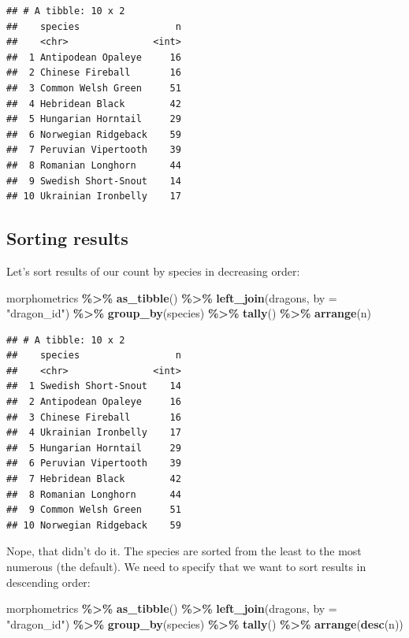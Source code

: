 \documentclass[
]{book}
\newenvironment{Shaded}{\begin{snugshade}}{\end{snugshade}}
\newcommand{\AttributeTok}[1]{\textcolor[rgb]{0.13,0.29,0.53}{#1}}
\newcommand{\FunctionTok}[1]{\textcolor[rgb]{0.13,0.29,0.53}{\textbf{#1}}}
\newcommand{\NormalTok}[1]{#1}
\newcommand{\SpecialCharTok}[1]{\textcolor[rgb]{0.81,0.36,0.00}{\textbf{#1}}}
\newcommand{\StringTok}[1]{\textcolor[rgb]{0.31,0.60,0.02}{#1}}
\begin{document}
\begin{verbatim}
## # A tibble: 10 x 2
##    species                 n
##    <chr>               <int>
##  1 Antipodean Opaleye     16
##  2 Chinese Fireball       16
##  3 Common Welsh Green     51
##  4 Hebridean Black        42
##  5 Hungarian Horntail     29
##  6 Norwegian Ridgeback    59
##  7 Peruvian Vipertooth    39
##  8 Romanian Longhorn      44
##  9 Swedish Short-Snout    14
## 10 Ukrainian Ironbelly    17
\end{verbatim}

\hypertarget{sorting-results-1}{%
\subsection{Sorting results}\label{sorting-results-1}}

Let's sort results of our count by species in decreasing order:

\begin{Shaded}
\begin{Highlighting}[]
\NormalTok{morphometrics }\SpecialCharTok{\%\textgreater{}\%} 
  \FunctionTok{as\_tibble}\NormalTok{() }\SpecialCharTok{\%\textgreater{}\%} 
  \FunctionTok{left\_join}\NormalTok{(dragons, }\AttributeTok{by =} \StringTok{"dragon\_id"}\NormalTok{) }\SpecialCharTok{\%\textgreater{}\%}  
  \FunctionTok{group\_by}\NormalTok{(species) }\SpecialCharTok{\%\textgreater{}\%}
  \FunctionTok{tally}\NormalTok{() }\SpecialCharTok{\%\textgreater{}\%} 
  \FunctionTok{arrange}\NormalTok{(n)}
\end{Highlighting}
\end{Shaded}

\begin{verbatim}
## # A tibble: 10 x 2
##    species                 n
##    <chr>               <int>
##  1 Swedish Short-Snout    14
##  2 Antipodean Opaleye     16
##  3 Chinese Fireball       16
##  4 Ukrainian Ironbelly    17
##  5 Hungarian Horntail     29
##  6 Peruvian Vipertooth    39
##  7 Hebridean Black        42
##  8 Romanian Longhorn      44
##  9 Common Welsh Green     51
## 10 Norwegian Ridgeback    59
\end{verbatim}

Nope, that didn't do it. The species are sorted from the least to the most
numerous (the default). We need to specify that we want to sort results in
descending order:

\begin{Shaded}
\begin{Highlighting}[]
\NormalTok{morphometrics }\SpecialCharTok{\%\textgreater{}\%} 
  \FunctionTok{as\_tibble}\NormalTok{() }\SpecialCharTok{\%\textgreater{}\%} 
  \FunctionTok{left\_join}\NormalTok{(dragons, }\AttributeTok{by =} \StringTok{"dragon\_id"}\NormalTok{) }\SpecialCharTok{\%\textgreater{}\%}  
  \FunctionTok{group\_by}\NormalTok{(species) }\SpecialCharTok{\%\textgreater{}\%}
  \FunctionTok{tally}\NormalTok{() }\SpecialCharTok{\%\textgreater{}\%} 
  \FunctionTok{arrange}\NormalTok{(}\FunctionTok{desc}\NormalTok{(n))}
\end{Highlighting}
\end{Shaded}
\end{document}

